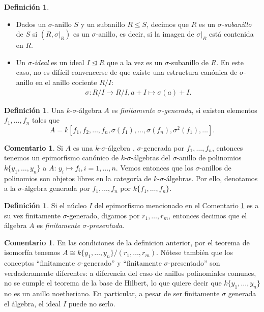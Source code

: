 \documentclass[letterpaper]{article}
\theoremstyle{definition}
\newtheorem{rem}[Satz]{Comentario}
\newtheorem{defn}[Satz]{Definici\'on}
\begin{document}
\begin{defn} $\phantom{}$
\begin{itemize}
\item Dados un $\sigma$-anillo $S$  y un subanillo $R \leq S$, decimos que $R$ es un $\sigma$\emph{-subanillo} de $S$ si $(R,\sigma|_{R})$ es un $\sigma$-anillo,
es decir, si la imagen de $\sigma|_{R}$ est\'a contenida en $R$.
\item Un $\sigma$\emph{-ideal} es un ideal $I \unlhd R$ que a la vez es un $\sigma$-subanillo de $R$. En este caso, no es dif\'icil convencerse de que existe una estructura can\'onica de $\sigma$-anillo en el anillo cociente $R/I$:
\begin{align*} \sigma: R/I \rightarrow R/I, a + I \mapsto \sigma(a) + I. \end{align*}
\end{itemize}
\end{defn}

\begin{defn}
Una $k$-$\sigma$-\'algebra  $A$ es \emph{finitamente $\sigma$-generada}, si existen elementos $f_1, \ldots, f_n$ tales que $$A = k[f_1,f_2,\ldots,f_n,\sigma(f_1),\ldots,\sigma(f_n),\sigma^2(f_1),\ldots].$$
\end{defn}

\begin{rem}\label{epipoli}
Si $A$ es una $k$-$\sigma$-\'algebra , $\sigma$-generada por $f_1, \ldots, f_n$, entonces tenemos un epimorfismo can\'onico de $k$-$\sigma$-\'algebras del $\sigma$-anillo de polinomios $k\{y_1, \ldots, y_n \}$ a $A$: $y_i \mapsto f_i, i = 1, \ldots, n$. Vemos entonces que los $\sigma$-anillos de polinomios son objetos libres en la categor\'ia de $k$-$\sigma$-\'algebras. Por ello, denotamos a la $\sigma$-\'algebra  generada por $f_1, \ldots, f_n$ por $k\{f_1, \ldots, f_n\}$.
\end{rem}

\begin{defn}
Si el n\'ucleo $I$ del epimorfismo mencionado en el Comentario \ref{epipoli} es a su vez finitamente $\sigma$-generado, digamos por $r_1, \ldots, r_m$, entonces decimos que el \'algebra $A$ es \emph{finitamente $\sigma$-presentada}.
\end{defn}

\begin{rem}
En las condiciones de la definicion anterior, por el teorema de isomorf\'ia tenemos $A \cong k\{y_1, \ldots, y_n\}/(r_1,\ldots,r_m)$. N\'otese tambi\'en que los conceptos ``finitamente $\sigma$-generado'' y ``finitamente $\sigma$-presentado'' son ver\-da\-de\-ra\-men\-te diferentes: a diferencia del caso de anillos polinomiales comunes, no se cumple el teorema de la base de Hilbert, lo que quiere decir que $k\{y_1, \ldots, y_n\}$ no es un anillo noetheriano. En particular, a pesar de ser 
finitamente $\sigma$ generada el \'algebra, el ideal $I$ puede no serlo.
\end{rem}
\end{document}
